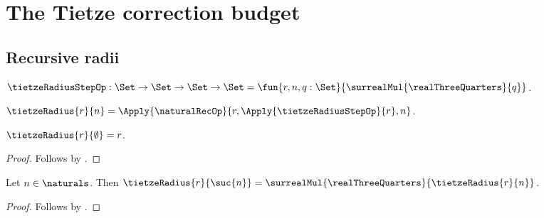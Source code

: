 




\section{The Tietze correction budget}

\subsection{Recursive radii}

\begin{definition}\label{tietze_radius_step}
    $\tietzeRadiusStepOp:\Set\to\Set\to\Set\to\Set
        =\fun{r,n,q:\Set}{\surrealMul{\realThreeQuarters}{q}}$.
\end{definition}

\begin{definition}\label{tietze_radius}
    $\tietzeRadius{r}{n}
        =\Apply{\naturalRecOp}
            {r,\Apply{\tietzeRadiusStepOp}{r},n}$.
\end{definition}

\begin{proposition}\label{tietze_radius_zero}
    $\tietzeRadius{r}{\emptyset}=r$.
\end{proposition}
\begin{proof}
    Follows by .
\end{proof}

\begin{proposition}\label{tietze_radius_successor}
    Let $n\in\naturals$.
    Then
        $\tietzeRadius{r}{\suc{n}}
            =\surrealMul{\realThreeQuarters}{\tietzeRadius{r}{n}}$.
\end{proposition}
\begin{proof}
    Follows by
        .
\end{proof}

